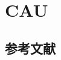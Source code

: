 \documentclass[twoside]{article}
\begin{document}
    \section*{CAU}
    \subsection{参考文献}
    \cite{Huzhenzhen2018}
    \cite{王夫之1845--}\cite{KENNEDY1975-339-360}%
    \nocite{汪昂1881--}%

\printbibliography

    
\end{document}
